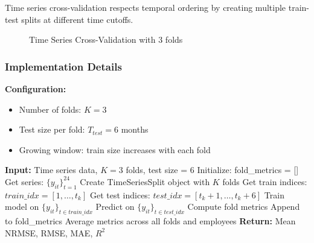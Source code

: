 \documentclass[12pt,a4paper]{article}
\begin{document}
Time series cross-validation respects temporal ordering by creating multiple train-test splits at different time cutoffs.

\begin{figure}[H]
\centering
{}
\caption{Time Series Cross-Validation with 3 folds}
\end{figure}

\subsubsection{Implementation Details}

\textbf{Configuration:}
\begin{itemize}
    \item Number of folds: $K = 3$
    \item Test size per fold: $T_{test} = 6$ months
    \item Growing window: train size increases with each fold
\end{itemize}

\begin{algorithm}[H]
\caption{Time Series Cross-Validation}
\begin{algorithmic}[1]
\State \textbf{Input:} Time series data, $K=3$ folds, test size = 6
\State Initialize: fold\_metrics = []
    \State Get series: $\{y_{it}\}_{t=1}^{24}$
    \State Create TimeSeriesSplit object with $K$ folds
        \State Get train indices: $train\_idx = [1, \ldots, t_k]$
        \State Get test indices: $test\_idx = [t_k+1, \ldots, t_k+6]$
        \State 
        \State Train model on $\{y_{it}\}_{t \in train\_idx}$
        \State Predict on $\{y_{it}\}_{t \in test\_idx}$
        \State Compute fold metrics
        \State Append to fold\_metrics
    \EndFor
\EndFor
\State
\State Average metrics across all folds and employees
\State \textbf{Return:} Mean NRMSE, RMSE, MAE, $R^2$
\end{algorithmic}
\end{algorithm}
\end{document}
